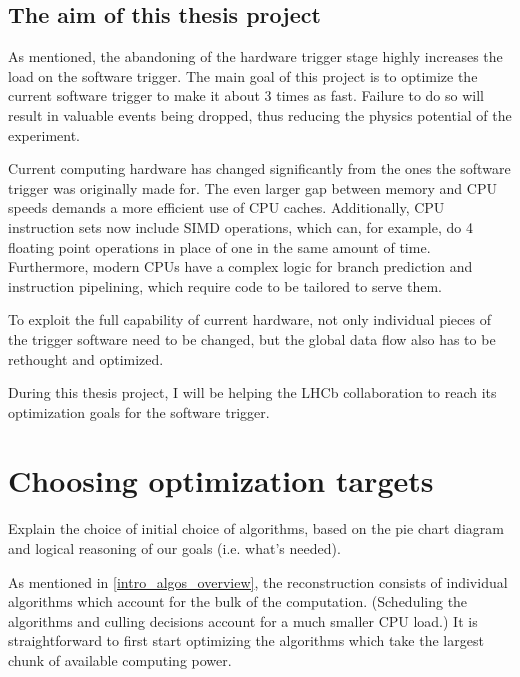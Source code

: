 \documentclass[12pt]{article}
\begin{document}
	\subsection{The aim of this thesis project}
	
	As mentioned, the abandoning of the hardware trigger stage highly increases the load on the software trigger. The main goal of this project is to optimize the current software trigger to make it about 3 times as fast. Failure to do so will result in valuable events being dropped, thus reducing the physics potential of the experiment.
	
	Current computing hardware has changed significantly from the ones the software trigger was originally made for. The even larger gap between memory and CPU speeds demands a more efficient use of CPU caches. Additionally, CPU instruction sets now include SIMD operations, which can, for example, do 4 floating point operations in place of one in the same amount of time. Furthermore, modern CPUs have a complex logic for branch prediction and instruction pipelining, which require code to be tailored to serve them.

	To exploit the full capability of current hardware, not only individual pieces of the trigger software need to be changed, but the global data flow also has to be rethought and optimized.
	
	During this thesis project, I will be helping the LHCb collaboration to reach its optimization goals for the software trigger.
	
	\newpage
	\section{Choosing optimization targets}
	
	\color{red}
	Explain the choice of initial choice of algorithms, based on the pie chart diagram and logical reasoning of our goals (i.e. what's needed).
	\color{black}
	
	As mentioned in \ref{intro_algos_overview}, the reconstruction consists of individual algorithms which account for the bulk of the computation. (Scheduling the algorithms and culling decisions account for a much smaller CPU load.) It is straightforward to first start optimizing the algorithms which take the largest chunk of available computing power.
	
\end{document}
